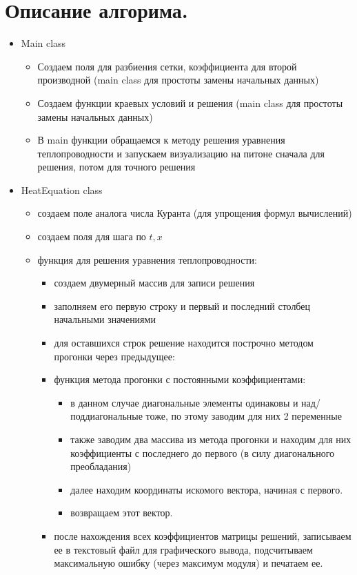 \documentclass[12pt,a4paper]{scrartcl}
\begin{document}
\section{Описание алгорима.}
\begin{itemize}
    \item Main class 
    \begin{itemize}
        \item Создаем поля для разбиения сетки, коэффициента для
        второй производной (main class для простоты замены начальных
        данных)
        \item Создаем функции краевых условий и решения (main class
        для простоты замены начальных данных)
        \item В main функции обращаемся к методу решения уравнения
        теплопроводности и запускаем визуализацию на питоне сначала
        для
        решения, потом для точного решения
    \end{itemize}
    \item HeatEquation class
    \begin{itemize}
        \item создаем поле аналога числа Куранта (для упрощения
        формул
        вычислений)
        \item создаем поля для шага по $t,x$  
        \item функция для решения уравнения теплопроводности:
        \begin{itemize}
            \item создаем двумерный массив для записи решения 
            \item заполняем его первую строку и первый и последний 
            столбец начальными значениями
            \item для оставшихся строк решение находится построчно 
            методом прогонки через предыдущее:
            \item функция метода прогонки с постоянными
            коэффициентами:
            \begin{itemize}
                \item в данном случае диагональные элементы одинаковы
                и над/поддиагональные тоже, по этому заводим для них
                2 переменные
                \item также заводим два массива из метода прогонки и 
                находим для них коэффициенты с последнего до первого
                (в силу диагонального преобладания)
                \item далее находим координаты искомого вектора, начиная с первого.
                \item возвращаем этот вектор.
            \end{itemize}
            \item после нахождения всех коэффициентов матрицы
            решений, записываем ее в текстовый файл для графического
            вывода, подсчитываем максимальную ошибку (через
            максимум модуля) и печатаем ее.
        \end{itemize}
    \end{itemize}
\end{itemize}
\end{document}
